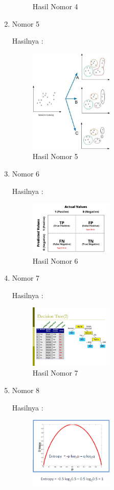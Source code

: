 \begin{enumerate}
\begin{figure}[H]
		\centering
		\caption{Hasil Nomor 4}
	\end{figure}
\item Nomor 5
		\hfill\break
		
	Hasilnya :
	\begin{figure}[H]
		\includegraphics[width=4cm]{figures/1174053/2/clustering.jpg}
		\centering
		\caption{Hasil Nomor 5}
	\end{figure}
\item Nomor 6
		\hfill\break
		
	Hasilnya :
	\begin{figure}[H]
		\includegraphics[width=4cm]{figures/1174053/2/confusion.jpeg}
		\centering
		\caption{Hasil Nomor 6}
	\end{figure}
\item Nomor 7
		\hfill\break
		
	Hasilnya :
	\begin{figure}[H]
		\includegraphics[width=4cm]{figures/1174053/2/decision.jpg}
		\centering
		\caption{Hasil Nomor 7}
	\end{figure}
\item Nomor 8
		\hfill\break
		
	Hasilnya :
	\begin{figure}[H]
		\includegraphics[width=4cm]{figures/1174053/2/entropy.png}

\end{figure}
\end{enumerate}

